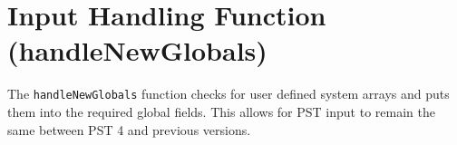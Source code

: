 \section{Input Handling Function (handleNewGlobals)} 

The \verb|handleNewGlobals| function checks for user defined system arrays and puts them into the required global fields.
This allows for PST input to remain the same between PST 4 and previous versions.
